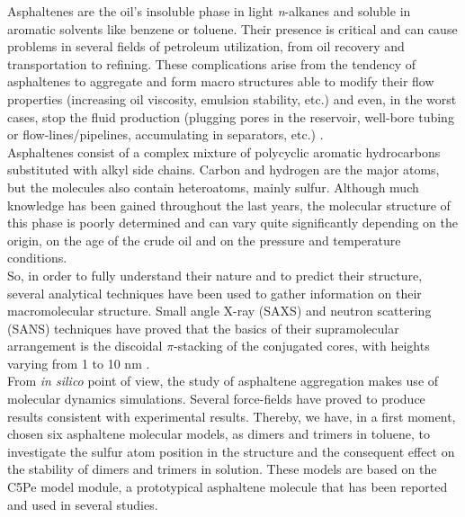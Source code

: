 
Asphaltenes are the oil's insoluble phase in light \textit{n}-alkanes and soluble in aromatic solvents like benzene or toluene\cite{mullins2011asphaltenes}. Their presence is critical and can cause problems in several fields of petroleum utilization, from oil recovery and transportation to refining.\cite{adams2014asphaltene} These complications arise from the tendency of asphaltenes to aggregate and form macro structures able to modify their flow properties (increasing oil viscosity, emulsion stability, etc.) and even, in the worst cases, stop the fluid production (plugging pores in the reservoir, well-bore tubing or flow-lines/pipelines, accumulating in separators, etc.) \cite{benamsili2013multi}.\\

Asphaltenes consist of a complex mixture of polycyclic aromatic hydrocarbons substituted with alkyl side chains. Carbon and hydrogen are the major atoms, but the molecules also contain heteroatoms, mainly sulfur.\cite{mullins2010modified} Although much knowledge has been gained throughout the last years, the molecular structure of this phase is poorly determined and can vary quite significantly depending on the origin, on the age of the crude oil and on the pressure and temperature conditions\cite{sabbah2011evidence}.\\

So, in order to fully understand their nature and to predict their structure, several analytical techniques have been used to gather information on their macromolecular structure. Small angle X-ray (SAXS) and neutron scattering (SANS) techniques have proved that the basics of their supramolecular arrangement is the discoidal $\pi$-stacking of the conjugated cores, with heights varying from 1 to 10 nm \cite{eyssautier2011insight,barre2009relation}.\\

From \textit{in silico} point of view, the study of asphaltene aggregation makes use of molecular dynamics simulations. Several force-fields have proved to produce results consistent with experimental results.\cite{sedghi2013effect,liu2015molecular,gao2014molecular} Thereby, we have, in a first moment, chosen six asphaltene molecular models, as dimers and trimers in toluene, to investigate the sulfur atom position in the structure and the consequent effect on the stability of dimers and trimers in solution. These models are based on the C5Pe model module, a prototypical asphaltene molecule that has been reported and used in several studies\cite{gao2014molecular,teklebrhan2014initial}.\\

